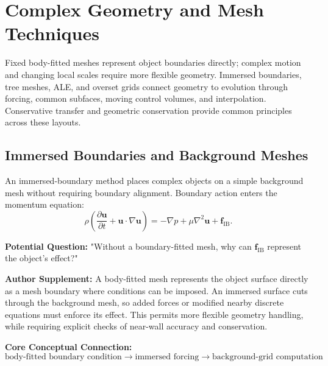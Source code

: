 \chapter{Complex Geometry and Mesh Techniques}\label{ch:21}
\begin{chaptersummary}
Fixed body-fitted meshes represent object boundaries directly; complex motion and changing local scales require more flexible geometry. Immersed boundaries, tree meshes, ALE, and overset grids connect geometry to evolution through forcing, common subfaces, moving control volumes, and interpolation. Conservative transfer and geometric conservation provide common principles across these layouts.
\end{chaptersummary}
\section{Immersed Boundaries and Background Meshes}
An immersed-boundary method places complex objects on a simple background mesh without requiring boundary alignment. Boundary action enters the momentum equation:
\[
\rho\left(
\frac{\partial\bm u}{\partial t}
+\bm u\cdot\nabla\bm u
\right)
=
-\nabla p+\mu\nabla^2\bm u+\bm f_{\mathrm{IB}}.
\]

\begin{authornote}
\textbf{Potential Question:}
"Without a boundary-fitted mesh, why can \(\bm f_{\mathrm{IB}}\) represent the object's effect?"

\textbf{Author Supplement:}
A body-fitted mesh represents the object surface directly as a mesh boundary where conditions can be imposed. An immersed surface cuts through the background mesh, so added forces or modified nearby discrete equations must enforce its effect. This permits more flexible geometry handling, while requiring explicit checks of near-wall accuracy and conservation.

\textbf{Core Conceptual Connection:}
\[
\text{body-fitted boundary condition}
\longrightarrow
\text{immersed forcing}
\longrightarrow
\text{background-grid computation}
\]
\end{authornote}

